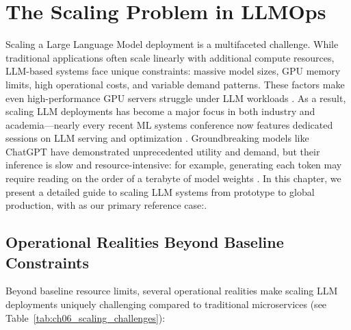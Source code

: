 \section{The Scaling Problem in LLMOps}
\label{sec:scaling-problem}
Scaling a Large Language Model deployment is a multifaceted challenge. While traditional applications often scale linearly with additional compute resources, LLM-based systems face unique constraints: massive model sizes, GPU memory limits, high operational costs, and variable demand patterns. These factors make even high-performance GPU servers struggle under LLM workloads \cite{Kwon2023vLLM}. As a result, scaling LLM deployments has become a major focus in both industry and academia—nearly every recent ML systems conference now features dedicated sessions on LLM serving and optimization \cite{Kwon2023vLLM}. Groundbreaking models like ChatGPT have demonstrated unprecedented utility and demand, but their inference is slow and resource-intensive: for example, generating each token may require reading on the order of a terabyte of model weights \cite{google2022_chip}. In this chapter, we present a detailed guide to scaling LLM systems from prototype to global production, with \ishtar{} as our primary reference case:\cite{vllm_pagedattention}.

\subsection{Operational Realities Beyond Baseline Constraints}\label{sec:scaling-operational-realities}
Beyond baseline resource limits, several operational realities make scaling LLM deployments uniquely challenging compared to traditional microservices (see Table~\ref{tab:ch06_scaling_challenges}):

